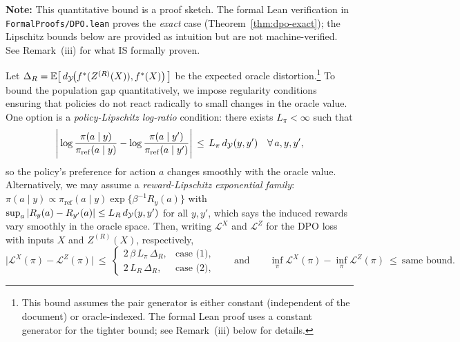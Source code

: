 \begin{theorem}\label{thm:dpo-gap}
\textbf{Note:} This quantitative bound is a proof sketch. The formal Lean verification in \texttt{FormalProofs/DPO.lean} proves the \emph{exact} case (Theorem~\ref{thm:dpo-exact}); the Lipschitz bounds below are provided as intuition but are not machine-verified. See Remark~(iii) for what IS formally proven.

Let $\Delta_R=\mathbb{E}\big[\,d_{\mathcal{Y}}\!\big(f^{\ast}(Z^{(R)}(X)),f^{\ast}(X)\big)\,\big]$ be the expected oracle distortion.\footnote{This bound assumes the pair generator is either constant (independent of the document) or oracle-indexed. The formal Lean proof uses a constant generator for the tighter bound; see Remark~(iii) below for details.} To bound the population gap quantitatively, we impose regularity conditions ensuring that policies do not react radically to small changes in the oracle value. One option is a \emph{policy-Lipschitz log-ratio} condition: there exists $L_\pi<\infty$ such that
\[
\Bigg|\log\frac{\pi(a\mid y)}{\pi_{\mathrm{ref}}(a\mid y)}-\log\frac{\pi(a\mid y')}{\pi_{\mathrm{ref}}(a\mid y')}\Bigg|\,\le\,L_\pi\,d_{\mathcal{Y}}(y,y')\quad\forall\,a,y,y',
\]
so the policy's preference for action $a$ changes smoothly with the oracle value. Alternatively, we may assume a \emph{reward-Lipschitz exponential family}: $\pi(a\mid y)\propto \pi_{\mathrm{ref}}(a\mid y)\exp\{\beta^{-1}R_y(a)\}$ with $\sup_a|R_y(a)-R_{y'}(a)|\le L_R\,d_{\mathcal{Y}}(y,y')$ for all $y,y'$, which says the induced rewards vary smoothly in the oracle space.
Then, writing $\mathcal L^{X}$ and $\mathcal L^{Z}$ for the DPO loss with inputs $X$ and $Z^{(R)}(X)$, respectively,
\[
\big|\mathcal L^{X}(\pi)-\mathcal L^{Z}(\pi)\big|
\ \le\
\begin{cases}
2\,\beta\,L_\pi\,\Delta_R,&\text{case (1)},\\[2pt]
2\,L_R\,\Delta_R,&\text{case (2)},
\end{cases}
\qquad
\text{and}\qquad
\inf_\pi \mathcal L^{X}(\pi)-\inf_\pi \mathcal L^{Z}(\pi)\ \le\ \text{same bound}.
\]
\end{theorem}

